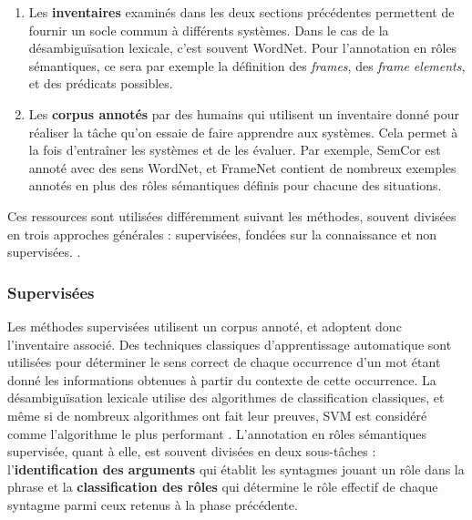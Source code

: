 \begin{enumerate}

    \item Les \textbf{inventaires} examinés dans les deux sections précédentes
        permettent de fournir un socle commun à différents systèmes. Dans le
        cas de la désambiguïsation lexicale, c'est souvent WordNet. Pour
        l'annotation en rôles sémantiques, ce sera par exemple la définition
        des \textit{frames}, des \textit{frame elements}, et des prédicats
        possibles.

    \item Les \textbf{corpus annotés} par des humains qui utilisent un
        inventaire donné pour réaliser la tâche qu'on essaie de faire apprendre
        aux systèmes. Cela permet à la fois d'entraîner les systèmes et de les
        évaluer. Par exemple, SemCor est annoté avec des sens WordNet, et
        FrameNet contient de nombreux exemples annotés en plus des rôles
        sémantiques définis pour chacune des situations.

\end{enumerate}

Ces ressources sont utilisées différemment suivant les méthodes, souvent
divisées en trois approches générales : supervisées, fondées sur la
connaissance et non supervisées. \citep{navigli2009word}.

\subsubsection{Supervisées}

Les méthodes supervisées utilisent un corpus annoté, et adoptent donc
l'inventaire associé. Des techniques classiques d'apprentissage automatique
sont utilisées pour déterminer le sens correct de chaque occurrence d'un mot
étant donné les informations obtenues à partir du contexte de cette occurrence.
La désambiguïsation lexicale utilise des algorithmes de classification
classiques, et même si de nombreux algorithmes ont fait leur preuves, SVM est
considéré comme l'algorithme le plus performant \cite{navigli2012quick}.
L'annotation en rôles sémantiques supervisée, quant à elle, est souvent
divisées en deux sous-tâches : l'\textbf{identification des arguments} qui
établit les syntagmes jouant un rôle dans la phrase et la
\textbf{classification des rôles} qui détermine le rôle effectif de chaque
syntagme parmi ceux retenus à la phase précédente.


